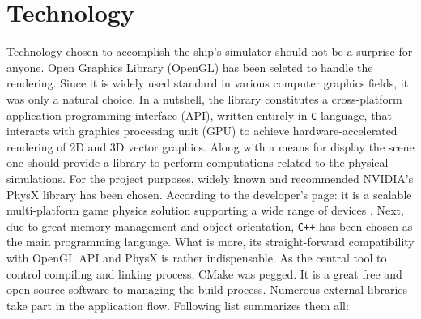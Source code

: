 \documentclass{report}
\begin{document}
\section{Technology} \label{sec:technology}
Technology chosen to accomplish the ship's simulator should not be a surprise for anyone. Open Graphics Library (OpenGL) has been seleted to handle the rendering. Since it is widely used standard in various computer graphics fields, it was only a natural choice. In a nutshell, the library constitutes a cross-platform application programming interface (API), written entirely in \texttt{C} language, that interacts with graphics processing unit (GPU) to achieve hardware-accelerated rendering of 2D and 3D vector graphics. Along with a means for display the scene one should provide a library to perform computations related to the physical simulations. For the project purposes, widely known and recommended NVIDIA's PhysX library has been chosen. According to the developer's page: it is a scalable multi-platform game physics solution supporting a wide range of devices \cite{physx}. Next, due to great memory management and object orientation, \texttt{C++} has been chosen as the main programming language. What is more, its straight-forward compatibility with OpenGL API and PhysX is rather indispensable. As the central tool to control compiling and linking process, CMake was pegged. It is a great free and open-source software to managing the build process. Numerous external libraries take part in the application flow. Following list summarizes them all:
\end{document}
